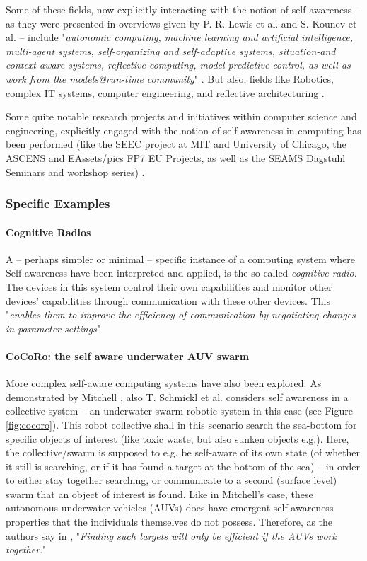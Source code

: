 	Some of these fields, now explicitly interacting with the notion of self-awareness -- as they were presented in overviews given by P. R. Lewis et al. \cite{sacs17_ch3} and S. Kounev et al. \cite{sacs17_ch1} -- include "\textit{autonomic computing, machine learning and artificial intelligence, multi-agent systems, self-organizing and self-adaptive systems, situation-and context-aware systems, reflective computing, model-predictive control, as well as work from the models@run-time community}" \cite{sacs17_ch1}. But also, fields like Robotics, complex IT systems, computer engineering, and reflective architecturing \cite{sacs17_ch3}.

	Some quite notable research projects and initiatives within computer science and engineering, explicitly engaged with the notion of self-awareness in computing has been performed (like the SEEC project at MIT and University of Chicago, the ASCENS and EAssets/pics FP7 EU Projects, as well as the SEAMS Dagstuhl Seminars and workshop series) \cite{sacs17_ch1}.


		\subsubsection{Specific Examples}

			\paragraph{Cognitive Radios \nl}

			A -- perhaps simpler or minimal -- specific instance of a computing system where Self-awareness have been interpreted and applied, is the so-called \textit{cognitive radio}. The devices in this system control their own capabilities and monitor other devices' capabilities through communication with these other devices. This "\textit{enables them to improve the efficiency of communication by negotiating changes in parameter settings}" \cite{sacs17_ch3}

			\paragraph{CoCoRo: the self aware underwater AUV swarm \nl}

			More complex self-aware computing systems have also been explored. As demonstrated by Mitchell \cite{mitchell}, also T. Schmickl et al. considers self awareness in a collective system -- an underwater swarm robotic system \cite{cocoro} in this case (see Figure \ref{fig:cocoro}). This robot collective shall in this scenario search the sea-bottom for specific objects of interest (like toxic waste, but also sunken objects e.g.). Here, the collective/swarm is supposed to e.g. be self-aware of its own state (of whether it still is searching, or if it has found a target at the bottom of the sea) -- in order to either stay together searching, or communicate to a second (surface level) swarm that an object of interest is found. Like in Mitchell's case, these autonomous underwater vehicles (AUVs) does have emergent self-awareness properties that the individuals themselves do not possess. Therefore, as the authors say in \cite{cocoro}, "\textit{Finding such targets will only be efficient if the AUVs work together}."

